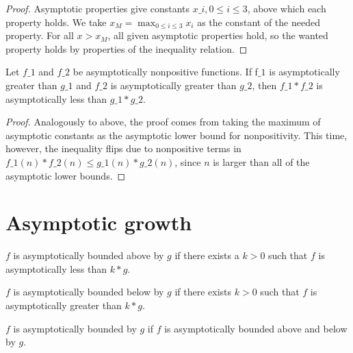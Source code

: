 \begin{proof}
    \leanok
    Asymptotic properties give constants $x\_i, 0 \le i \le 3$, above which each property holds.
    We take $x_M = \max_{0 \le i \le 3} x_i$ as the constant of the needed property. 
    For all $x > x_M$, all given asymptotic properties hold, so the wanted property holds
    by properties of the inequality relation.
\end{proof}

\begin{theorem}
    \label{thm:asymp_ge_nonpos_mul}
    \leanok
    Let $f\_1$ and $f\_2$ be asymptotically nonpositive functions. If f$\_1$ is asymptotically
    greater than $g\_1$ and $f\_2$ is asymptotically greater than $g\_2$, then $f\_1 * f\_2$
    is asymptotically less than $g\_1 * g\_2$.
\end{theorem}

\begin{proof}
    \leanok
    Analogously to above, the proof comes from taking the maximum of asymptotic constants 
    as the asymptotic lower bound for nonpositivity. This time, however, the inequality
    flips due to nonpositive terms in $f\_1(n) * f\_2(n) \le g\_1(n) * g\_2(n)$, since 
    $n$ is larger than all of the asymptotic lower bounds.
\end{proof}


\section{Asymptotic growth}

\begin{definition}
    \label{def:asymp_bounded_above}
    \leanok
    $f$ is asymptotically bounded above by $g$ if there exists a $k > 0$ 
    such that $f$ is asymptotically less than $k*g$.
\end{definition}

\begin{definition}
    \label{def:asymp_bounded_below}
    \leanok
    $f$ is asymptotically bounded below by $g$ if there exists $k > 0$ 
    such that $f$ is asymptotically greater than $k*g$.
\end{definition}

\begin{definition}
    \label{def:asymp_bounded}
    \leanok
    $f$ is asymptotically bounded by $g$ if $f$ is asymptotically bounded
    above and below by $g$.
\end{definition}

